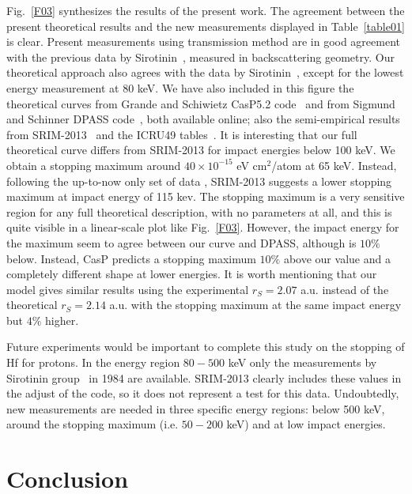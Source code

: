 \documentclass[aps,pra,reprint,superscriptaddress]{revtex4-1}
\begin{document}
Fig.~\ref{F03} synthesizes the results of the present work.
The agreement between the present theoretical results and the new
measurements displayed in Table~\ref{table01} is clear. Present 
measurements using transmission method are in good agreement with the 
previous data by Sirotinin~\cite{Sirotinin}, measured in backscattering 
geometry. Our theoretical approach also agrees with the data by 
Sirotinin~\cite{Sirotinin}, except for the lowest energy measurement at 
80 keV. We have also included in this figure the theoretical curves from 
Grande and Schiwietz CasP5.2 code~\cite{Grande,casp52} and from Sigmund 
and Schinner DPASS code~\cite{DPASS20}, both available online; also the 
semi-empirical results from SRIM-2013~\cite{Ziegler01} and the ICRU49 
tables~\cite{ICRU49}. It is interesting that our full theoretical curve 
differs from SRIM-2013 for impact energies below 100 keV. We obtain a 
stopping maximum around $40 \times 10^{-15}$ eV cm$^2$/atom  at 65 keV. 
Instead, following the up-to-now only set of data \cite{Sirotinin}, SRIM-2013
suggests a lower stopping maximum  at impact energy of 115 kev. 
The stopping maximum is a very sensitive region for any full theoretical 
description, with no parameters at all, and this is quite visible in a 
linear-scale plot like Fig.~\ref{F03}. However, the impact energy for 
the maximum seem to agree between our curve and DPASS, although is 
$10 \%$ below. Instead, CasP predicts a stopping maximum $10 \%$ above 
our value and a completely different shape at lower energies. It is 
worth mentioning that our model gives similar results using the experimental 
$r_S=2.07$ a.u. instead of the theoretical $r_S=2.14$ a.u. with the 
stopping maximum at the same impact energy but $4\%$ higher. 

Future experiments would be important to complete this study on the 
stopping of Hf for protons. In the energy region $80-500$ keV only 
the measurements by Sirotinin group~\cite{Sirotinin} in 1984 are 
available. SRIM-2013 clearly includes these values in the adjust of 
the code, so it does not represent a test for this data. Undoubtedly, 
new measurements are needed in three specific energy regions: 
below 500 keV, around the stopping maximum (i.e. $50-200$ keV) and at 
low impact energies.

\section{Conclusion}
\label{conclusion}
\end{document}
